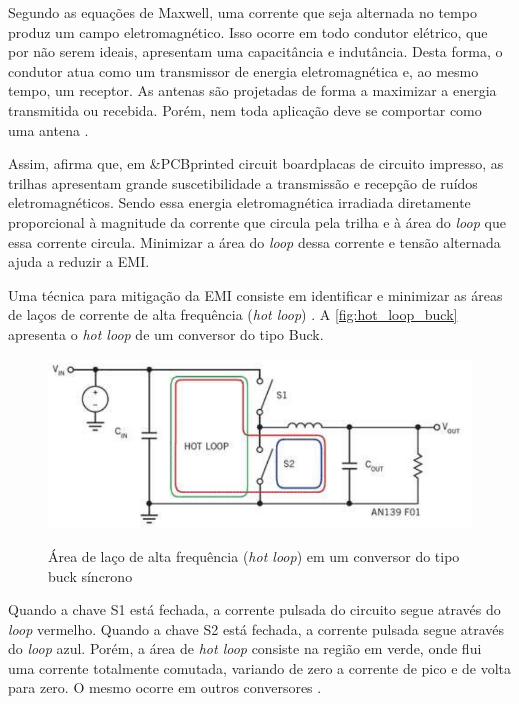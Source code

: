             Segundo as equações de Maxwell, uma corrente que seja alternada no tempo produz um campo eletromagnético. Isso ocorre em todo condutor elétrico, que por não serem ideais, apresentam uma capacitância e indutância. Desta forma, o condutor atua como um transmissor de energia eletromagnética e, ao mesmo tempo, um receptor. As antenas são projetadas de forma a maximizar a energia transmitida ou recebida. Porém, nem toda aplicação deve se comportar como uma antena \cite{ref:EMC_artigo_Texas}.
            
            Assim,  afirma que, em \abreviatura&{PCB}{printed circuit board}{placas de circuito impresso}, as trilhas apresentam grande suscetibilidade a transmissão e recepção de ruídos eletromagnéticos. Sendo essa energia eletromagnética irradiada diretamente proporcional à magnitude da corrente que circula pela trilha e à área do \textit{loop} que essa corrente circula. Minimizar a área do \textit{loop} dessa corrente e tensão alternada ajuda a reduzir a EMI.
            
            Uma técnica para mitigação da EMI consiste em identificar e minimizar as áreas de laços de corrente de alta frequência (\textit{hot loop}) \cite{ref:EMC_HotLoop_kueck}. A \autoref{fig:hot_loop_buck} apresenta o \textit{hot loop} de um conversor do tipo Buck. 
            
            \begin{figure}[H]
            	\centering
            	\caption{Área de laço de alta frequência (\textit{hot loop}) em um conversor do tipo buck síncrono}
            	\includegraphics[scale=1]{pdf/outros/hotloop.pdf}
            	\label{fig:hot_loop_buck}
            \end{figure}
            
            Quando a chave S1 está fechada, a corrente pulsada do circuito segue através do \textit{loop} vermelho. Quando a chave S2 está fechada, a corrente pulsada segue através do \textit{loop} azul. Porém, a área de \textit{hot loop} consiste na região em verde, onde flui uma corrente totalmente comutada, variando de zero a corrente de pico e de volta para zero. O mesmo ocorre em outros conversores \cite{ref:EMC_HotLoop_kueck}. 
            
